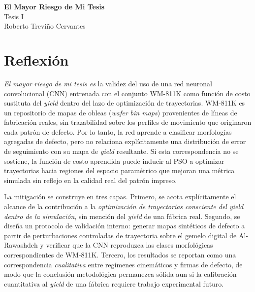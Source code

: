 \documentclass[11pt]{article}
\begin{document}
\setcounter{section}{0}

\thispagestyle{empty}

\begin{center}
{\LARGE \bf El Mayor Riesgo de Mi Tesis}\\[4pt]
{\large Tesis I}\\[2pt]
Roberto Treviño Cervantes
\end{center}

\section{Reflexión}

\textit{El mayor riesgo de mi tesis es} la validez del uso de una red neuronal convolucional (CNN) entrenada con el conjunto WM-811K como función de costo sustituta del \textit{yield} dentro del lazo de optimización de trayectorias. WM-811K es un repositorio de mapas de obleas (\textit{wafer bin maps}) provenientes de líneas de fabricación reales, sin trazabilidad sobre los perfiles de movimiento que originaron cada patrón de defecto. Por lo tanto, la red aprende a clasificar morfologías agregadas de defecto, pero no relaciona explícitamente una distribución de error de seguimiento con su mapa de \textit{yield} resultante. Si esta correspondencia no se sostiene, la función de costo aprendida puede inducir al PSO a optimizar trayectorias hacia regiones del espacio paramétrico que mejoran una métrica simulada sin reflejo en la calidad real del patrón impreso.

La mitigación se construye en tres capas. Primero, se acota explícitamente el alcance de la contribución a la \textit{optimización de trayectorias consciente del \textit{yield} dentro de la simulación}, sin mención del \textit{yield} de una fábrica real. Segundo, se diseña un protocolo de validación interno: generar mapas sintéticos de defecto a partir de perturbaciones controladas de trayectoria sobre el gemelo digital de Al-Rawashdeh y verificar que la CNN reproduzca las clases morfológicas correspondientes de WM-811K. Tercero, los resultados se reportan como una correspondencia \emph{cualitativa} entre regímenes cinemáticos y firmas de defecto, de modo que la conclusión metodológica permanezca sólida aun si la calibración cuantitativa al \textit{yield} de una fábrica requiere trabajo experimental futuro.
\end{document}
